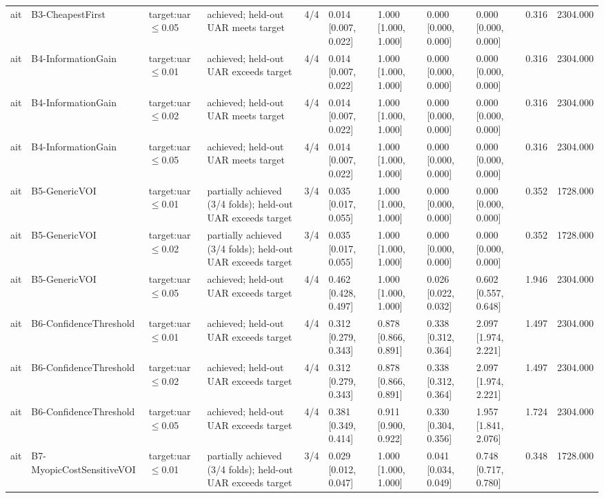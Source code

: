 \begin{table}[!ht]
{\begin{tabular}{lllllllllll}
ait & B3-CheapestFirst & target:uar$\le$0.05 & achieved; held-out UAR meets target & 4/4 & 0.014 [0.007, 0.022] & 1.000 [1.000, 1.000] & 0.000 [0.000, 0.000] & 0.000 [0.000, 0.000] & 0.316 & 2304.000 \\
ait & B4-InformationGain & target:uar$\le$0.01 & achieved; held-out UAR exceeds target & 4/4 & 0.014 [0.007, 0.022] & 1.000 [1.000, 1.000] & 0.000 [0.000, 0.000] & 0.000 [0.000, 0.000] & 0.316 & 2304.000 \\
ait & B4-InformationGain & target:uar$\le$0.02 & achieved; held-out UAR meets target & 4/4 & 0.014 [0.007, 0.022] & 1.000 [1.000, 1.000] & 0.000 [0.000, 0.000] & 0.000 [0.000, 0.000] & 0.316 & 2304.000 \\
ait & B4-InformationGain & target:uar$\le$0.05 & achieved; held-out UAR meets target & 4/4 & 0.014 [0.007, 0.022] & 1.000 [1.000, 1.000] & 0.000 [0.000, 0.000] & 0.000 [0.000, 0.000] & 0.316 & 2304.000 \\
ait & B5-GenericVOI & target:uar$\le$0.01 & partially achieved (3/4 folds); held-out UAR exceeds target & 3/4 & 0.035 [0.017, 0.055] & 1.000 [1.000, 1.000] & 0.000 [0.000, 0.000] & 0.000 [0.000, 0.000] & 0.352 & 1728.000 \\
ait & B5-GenericVOI & target:uar$\le$0.02 & partially achieved (3/4 folds); held-out UAR exceeds target & 3/4 & 0.035 [0.017, 0.055] & 1.000 [1.000, 1.000] & 0.000 [0.000, 0.000] & 0.000 [0.000, 0.000] & 0.352 & 1728.000 \\
ait & B5-GenericVOI & target:uar$\le$0.05 & achieved; held-out UAR exceeds target & 4/4 & 0.462 [0.428, 0.497] & 1.000 [1.000, 1.000] & 0.026 [0.022, 0.032] & 0.602 [0.557, 0.648] & 1.946 & 2304.000 \\
ait & B6-ConfidenceThreshold & target:uar$\le$0.01 & achieved; held-out UAR exceeds target & 4/4 & 0.312 [0.279, 0.343] & 0.878 [0.866, 0.891] & 0.338 [0.312, 0.364] & 2.097 [1.974, 2.221] & 1.497 & 2304.000 \\
ait & B6-ConfidenceThreshold & target:uar$\le$0.02 & achieved; held-out UAR exceeds target & 4/4 & 0.312 [0.279, 0.343] & 0.878 [0.866, 0.891] & 0.338 [0.312, 0.364] & 2.097 [1.974, 2.221] & 1.497 & 2304.000 \\
ait & B6-ConfidenceThreshold & target:uar$\le$0.05 & achieved; held-out UAR exceeds target & 4/4 & 0.381 [0.349, 0.414] & 0.911 [0.900, 0.922] & 0.330 [0.304, 0.356] & 1.957 [1.841, 2.076] & 1.724 & 2304.000 \\
ait & B7-MyopicCostSensitiveVOI & target:uar$\le$0.01 & partially achieved (3/4 folds); held-out UAR exceeds target & 3/4 & 0.029 [0.012, 0.047] & 1.000 [1.000, 1.000] & 0.041 [0.034, 0.049] & 0.748 [0.717, 0.780] & 0.348 & 1728.000 \\

\end{tabular}}
\end{table}
